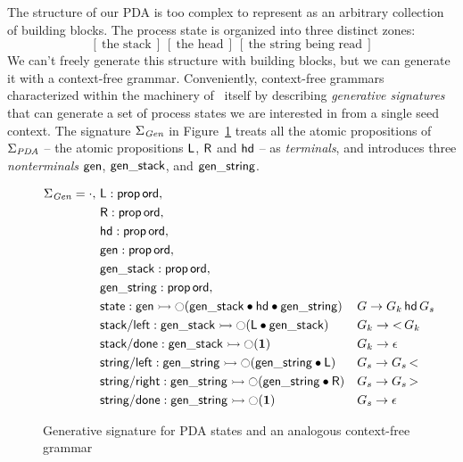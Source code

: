 The structure of our PDA is too complex to represent as an arbitrary
collection of building blocks. The process state is organized into
three distinct zones:
\[
[~\mbox{the stack}~]
~
[~\mbox{the head}~]
~
[~\mbox{the string being read}~]
\]
We can't freely generate this structure with building blocks, but
we can generate it with a context-free grammar. 
Conveniently, context-free
grammars characterized within the
machinery of \sls~itself by describing {\it generative signatures}
that can generate a set of process states we are interested in from
a single seed context.  The signature $\Sigma_{\it Gen}$ in
Figure~\ref{fig:pda-gen} treats all the atomic propositions of
$\Sigma_{\it PDA}$ -- the atomic propositions ${\sf L}$, ${\sf R}$ and
${\sf hd}$ -- as {\it terminals}, and introduces three {\it
  nonterminals} ${\sf gen}$, ${\sf gen\_stack}$, and ${\sf
  gen\_string}$.

\begin{figure}
\begin{align*}
 \Sigma_{\it Gen} = \cdot, 
~&{\sf L} : {\sf prop}\,{\sf ord},\\
~&{\sf R} : {\sf prop}\,{\sf ord},\\
~&{\sf hd} : {\sf prop}\,{\sf ord},\\
~&{\sf gen} : {\sf prop}\,{\sf ord},\\
~&{\sf gen\_stack} : {\sf prop}\,{\sf ord},\\
~&{\sf gen\_string} : {\sf prop}\,{\sf ord},\\
~&{\sf state} : {\sf gen} 
       \rightarrowtail {\ocircle}({\sf gen\_stack} \mathbin{\bullet} {\sf hd} 
                         \mathbin{\bullet} {\sf gen\_string})
&& G \rightarrow G_k\,{\sf hd}\,G_s\\
~&{\sf stack/left} : {\sf gen\_stack} 
       \rightarrowtail {\ocircle}({\sf L} \mathbin{\bullet} {\sf gen\_stack})
&& G_k \rightarrow {\sf <}\,G_k \\
~&{\sf stack/done} : {\sf gen\_stack} \rightarrowtail {\ocircle}(\mathbf{1})
&& G_k \rightarrow \epsilon\\
~&{\sf string/left} : 
     {\sf gen\_string} 
       \rightarrowtail {\ocircle}({\sf gen\_string} \mathbin{\bullet} {\sf L})
&& G_s \rightarrow G_s\,{\sf <}\\
~&{\sf string/right} : 
     {\sf gen\_string} 
       \rightarrowtail {\ocircle}({\sf gen\_string} \mathbin{\bullet} {\sf R})
&& G_s \rightarrow G_s\,{\sf >}\\
~&{\sf string/done} : 
     {\sf gen\_string} 
       \rightarrowtail {\ocircle}(\mathbf{1})
&& G_s \rightarrow \epsilon
\end{align*}
\caption{Generative signature for PDA states and an analogous
  context-free grammar}
\label{fig:pda-gen}
\end{figure}

